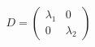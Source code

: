 \documentclass[preview]{standalone}
\begin{document}
\begin{align*}
D = \begin{pmatrix} \lambda_1 & 0 \\ 0 & \lambda_2 \end{pmatrix}
\end{align*}
\end{document}
